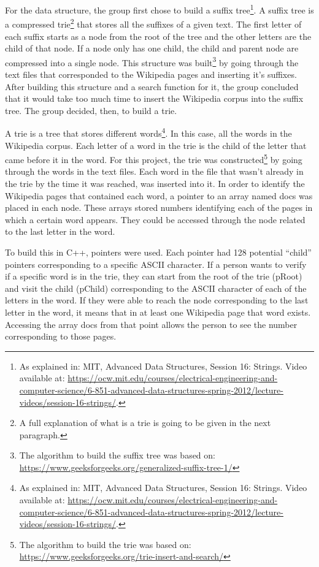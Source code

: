 \documentclass{article}
\begin{document}
For the data structure, the group first chose to build a suffix tree\footnote{As explained in: MIT, Advanced Data Structures, Session 16: Strings. Video available at: \url{https://ocw.mit.edu/courses/electrical-engineering-and-computer-science/6-851-advanced-data-structures-spring-2012/lecture-videos/session-16-strings/}.}. A suffix tree is a compressed trie\footnote{A full explanation of what is a trie is going to be given in the next paragraph.} that stores all the suffixes of a given text. The first letter of each suffix starts as a node from the root of the tree and the other letters are the child of that node. If a node only has one child, the child and parent node are compressed into a single node. This structure was built\footnote{The algorithm to build the suffix tree was based on: \url{https://www.geeksforgeeks.org/generalized-suffix-tree-1/}} by going through the text files that corresponded to the Wikipedia pages and inserting it's suffixes. After building this structure and a search function for it, the group concluded that it would take too much time to insert the Wikipedia corpus into the suffix tree. The group decided, then, to build a trie. 

A trie is a tree that stores different words\footnote{As explained in: MIT, Advanced Data Structures, Session 16: Strings. Video available at: \url{https://ocw.mit.edu/courses/electrical-engineering-and-computer-science/6-851-advanced-data-structures-spring-2012/lecture-videos/session-16-strings/}.}. In this case, all the words in the Wikipedia corpus. Each letter of a word in the trie is the child of the letter that came before it in the word. 
For this project, the trie was constructed\footnote{The algorithm to build the trie was based on: \url{https://www.geeksforgeeks.org/trie-insert-and-search/}} by going through the words in the text files. Each word in the file that wasn't already in the trie by the time it was reached, was inserted into it. In order to identify the Wikipedia pages that contained each word, a pointer to an array named docs was placed in each node. These arrays stored numbers identifying each of the pages in which a certain word appears. They could be accessed through the node related to the last letter in the word. 

To build this in C++, pointers were used. Each pointer had 128 potential ``child'' pointers corresponding to a specific ASCII character. If a person wants to verify if a specific word is in the trie, they can start from the root of the trie (pRoot) and visit the child (pChild) corresponding to the ASCII character of each of the letters in the word. If they were able to reach the node corresponding to the last letter in the word, it means that in at least one Wikipedia page that word exists. Accessing the array docs from that point allows the person to see the number corresponding to those pages.
\end{document}

